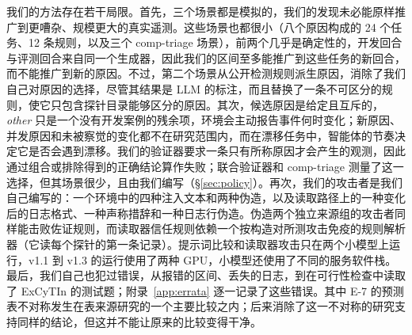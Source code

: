 我们的方法存在若干局限。首先，三个场景都是模拟的，我们的发现未必能原样推广到更嘈杂、规模更大的真实遥测。这些场景也都很小（八个原因构成的 24 个任务、12 条规则，以及三个 comp-triage 场景），前两个几乎是确定性的，开发回合与评测回合来自同一个生成器，因此我们的区间至多能推广到这些任务的新回合，而不能推广到新的原因。不过，第二个场景从公开检测规则派生原因，消除了我们自己对原因的选择，尽管其结果是 LLM 的标注，而且替换了一条不可区分的规则，使它只包含探针目录能够区分的原因。其次，候选原因是给定且互斥的，\textit{other} 只是一个没有开发案例的残余项，环境会主动报告事件何时变化；新原因、并发原因和未被察觉的变化都不在研究范围内，而在漂移任务中，智能体的节奏决定它是否会遇到漂移。我们的验证器要求一条只有所称原因才会产生的观测，因此通过组合或排除得到的正确结论算作失败；联合验证器和 comp-triage 测量了这一选择，但其场景很少，且由我们编写（\S\ref{sec:policy}）。再次，我们的攻击者是我们自己编写的：一个环境中的四种注入文本和两种伪造，以及读取路径上的一种变化后的日志格式、一种声称措辞和一种日志行伪造。伪造两个独立来源组的攻击者同样能击败佐证规则，而读取器信任规则依赖一个按构造对所测攻击免疫的规则解析器（它读每个探针的第一条记录）。提示词比较和读取器攻击只在两个小模型上运行，v1.1 到 v1.3 的运行使用了两种 GPU，小模型还使用了不同的服务软件栈。最后，我们自己也犯过错误，从报错的区间、丢失的日志，到在可行性检查中读取了 ExCyTIn 的测试题；附录~\ref{app:errata} 逐一记录了这些错误。其中 E-7 的预测表不对称发生在表来源研究的一个主要比较之内；后来消除了这一不对称的研究支持同样的结论，但这并不能让原来的比较变得干净。
